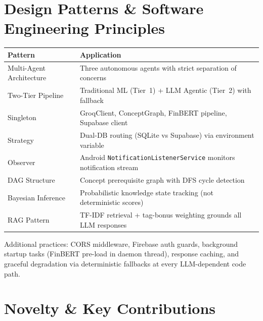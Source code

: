 \documentclass[12pt,a4paper]{article}
\begin{document}
\section{Design Patterns \& Software Engineering Principles}

\begin{table}[h!]
\centering
\renewcommand{\arraystretch}{1.2}
\begin{tabularx}{\textwidth}{l X}
\toprule
\textbf{Pattern} & \textbf{Application} \\
\midrule
Multi-Agent Architecture & Three autonomous agents with strict separation of concerns \\
Two-Tier Pipeline        & Traditional ML (Tier~1) + LLM Agentic (Tier~2) with fallback \\
Singleton                & GroqClient, ConceptGraph, FinBERT pipeline, Supabase client \\
Strategy                 & Dual-DB routing (SQLite vs Supabase) via environment variable \\
Observer                 & Android \texttt{NotificationListenerService} monitors notification stream \\
DAG Structure            & Concept prerequisite graph with DFS cycle detection \\
Bayesian Inference       & Probabilistic knowledge state tracking (not deterministic scores) \\
RAG Pattern              & TF-IDF retrieval + tag-bonus weighting grounds all LLM responses \\
\bottomrule
\end{tabularx}
\end{table}

Additional practices: CORS middleware, Firebase auth guards, background startup tasks (FinBERT pre-load in daemon thread), response caching, and graceful degradation via deterministic fallbacks at every LLM-dependent code path.

\newpage
\section{Novelty \& Key Contributions}
\end{document}
